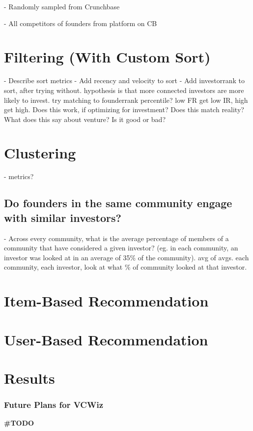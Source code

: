 - Randomly sampled from Crunchbase

- All competitors of founders from platform on CB

\section{Filtering (With Custom Sort)}

- Describe sort metrics
- Add recency and velocity to sort
- Add investorrank to sort, after trying without. hypothesis is that more connected investors are more likely to invest. try matching to founderrank percentile? low FR get low IR, high get high. Does this work, if optimizing for investment? Does this match reality? What does this say about venture? Is it good or bad?

\section{Clustering}

- metrics?

\subsection{Do founders in the same community engage with similar investors?}

- Across every community, what is the average percentage of members of a community that have considered a given investor? (eg. in each community, an investor was looked at in an average of 35\% of the community). avg of avgs. each community, each investor, look at what \% of community looked at that investor.

\section{Item-Based Recommendation}

\section{User-Based Recommendation}

\section{Results}


\subsubsection{Future Plans for VCWiz}

\textbf{\#TODO}
